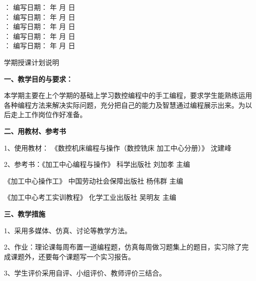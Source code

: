 {\newcommand{\ud}[2]{\underline{\makebox[#1]{\textbf{#2}}} }
\setlength{\baselineskip}{1.5\baselineskip}
：\ud{10em}{}  \hspace{1em} 编写日期：\ud{5.5em}{}年\ud{3em}{}月\ud{3em}{}日\\
：\ud{10em}{}  \hspace{1em} 编写日期：\ud{5.5em}{}年\ud{3em}{}月\ud{3em}{}日\\
：\ud{10em}{}  \hspace{1em} 编写日期：\ud{5.5em}{}年\ud{3em}{}月\ud{3em}{}日\\
：\ud{10em}{}  \hspace{1em} 编写日期：\ud{5.5em}{}年\ud{3em}{}月\ud{3em}{}日\\
：\ud{10em}{}  \hspace{1em} 编写日期：\ud{5.5em}{}年\ud{3em}{}月\ud{3em}{}日\\

\pagebreak

\begin{center}
\erhao \hei 学期授课计划说明
\end{center}
\xiaosi \setlength{\parindent}{2em} \setlength{\baselineskip}{22pt}

\textbf{一、教学目的与要求：}

本学期主要在上个学期的基础上学习数控编程中的手工编程，要求学生能熟练运用各种编程方法来解决实际问题，充分把自己的能力及智慧通过编程展示出来。为以后走上工作岗位作好准备。

\textbf{二、用教材、参考书}

1、使用教材： 《数控机床编程与操作（数控铣床 加工中心分册）》 沈建峰

2、参考书：《加工中心编程与操作》  科学出版社  刘加孝   主编

\hspace{4.5em}《加工中心操作工》 中国劳动社会保障出版社  杨伟群  主编

\hspace{4.5em}《加工中心考工实训教程》  化学工业出版社   吴明友 主编

\textbf{三、教学措施}

1、采用多媒体、仿真、讨论等教学方法。

2、作业：理论课每周布置一道编程题，仿真每周做习题集上的题目，实习除了完成课题外，还要每个课题写一个实习报告。

3、学生评价采用自评、小组评价、教师评价三结合。

}
